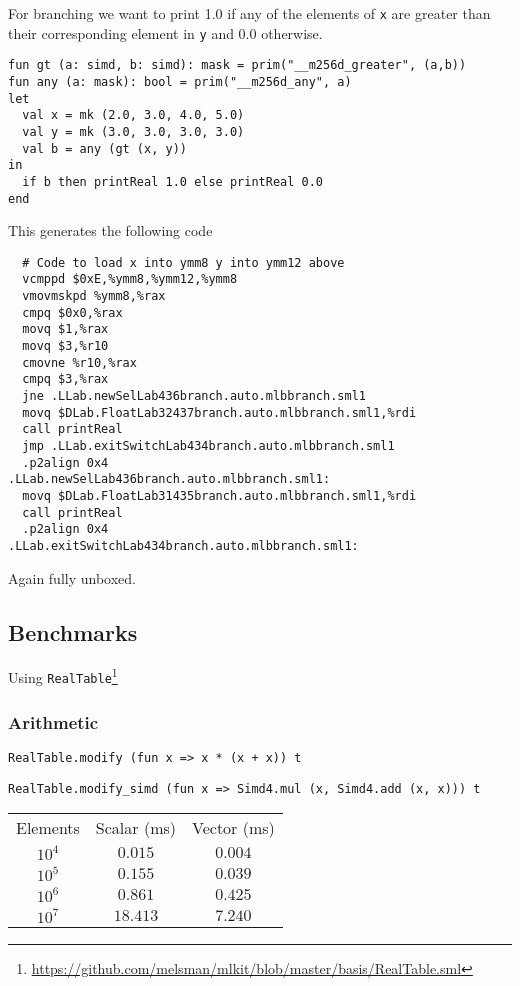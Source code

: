 \documentclass{article}
\begin{document}
For branching we want to print 1.0 if any of the elements of \verb!x! are greater than their corresponding element in \verb!y! and 0.0 otherwise.

\begin{lstlisting}
fun gt (a: simd, b: simd): mask = prim("__m256d_greater", (a,b))
fun any (a: mask): bool = prim("__m256d_any", a)
let
  val x = mk (2.0, 3.0, 4.0, 5.0)
  val y = mk (3.0, 3.0, 3.0, 3.0)
  val b = any (gt (x, y))
in 
  if b then printReal 1.0 else printReal 0.0
end
\end{lstlisting}

This generates the following code

\begin{verbatim}
  # Code to load x into ymm8 y into ymm12 above
  vcmppd $0xE,%ymm8,%ymm12,%ymm8
  vmovmskpd %ymm8,%rax
  cmpq $0x0,%rax
  movq $1,%rax
  movq $3,%r10
  cmovne %r10,%rax
  cmpq $3,%rax
  jne .LLab.newSelLab436branch.auto.mlbbranch.sml1
  movq $DLab.FloatLab32437branch.auto.mlbbranch.sml1,%rdi
  call printReal
  jmp .LLab.exitSwitchLab434branch.auto.mlbbranch.sml1
  .p2align 0x4
.LLab.newSelLab436branch.auto.mlbbranch.sml1:
  movq $DLab.FloatLab31435branch.auto.mlbbranch.sml1,%rdi
  call printReal
  .p2align 0x4
.LLab.exitSwitchLab434branch.auto.mlbbranch.sml1:
\end{verbatim}

Again fully unboxed.

\subsection{Benchmarks}

Using \texttt{RealTable}\footnote{\url{https://github.com/melsman/mlkit/blob/master/basis/RealTable.sml}}

\subsubsection{Arithmetic}

\begin{lstlisting}
RealTable.modify (fun x => x * (x + x)) t
\end{lstlisting}

\begin{lstlisting}
RealTable.modify_simd (fun x => Simd4.mul (x, Simd4.add (x, x))) t
\end{lstlisting}

\begin{center}
\begin{tabular}{ c c c }
    Elements & Scalar (ms) & Vector (ms) \\
    $10^4$ & $0.015$ & $0.004$ \\
    $10^5$ & $0.155$ & $0.039$ \\
    $10^6$ & $0.861$ & $0.425$ \\
    $10^7$ & $18.413$ & $7.240$
\end{tabular}
\end{center}
\end{document}
